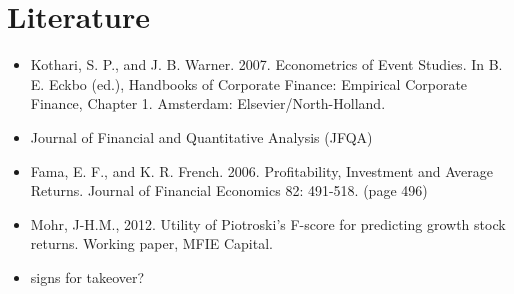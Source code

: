 \documentclass[12pt]{article}
\begin{document}
\section{Literature}

    \begin{itemize}
        \item Kothari, S. P., and J. B. Warner. 2007. Econometrics of Event Studies. In B. E. Eckbo (ed.), Handbooks of Corporate Finance: Empirical Corporate Finance, Chapter 1. Amsterdam: Elsevier/North-Holland.
        \item Journal of Financial and Quantitative Analysis (JFQA)
        \item Fama, E. F., and K. R. French. 2006. Profitability, Investment and Average Returns. Journal of Financial Economics 82: 491-518. (page 496)
        \item Mohr, J-H.M., 2012. Utility of Piotroski's F-score for predicting growth stock returns. Working paper, MFIE Capital.
        \item signs for takeover? 
    \end{itemize}
\end{document}
